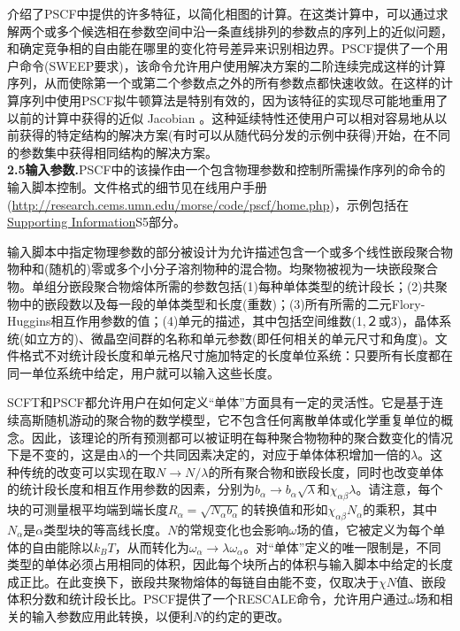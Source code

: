 \documentclass[12pt,a4paper]{article}
\begin{document}
介绍了PSCF中提供的许多特征，以简化相图的计算。在这类计算中，可以通过求解两个或多个候选相在参数空间中沿一条直线排列的参数点的序列上的近似问题，和确定竞争相的自由能在哪里的变化符号差异来识别相边界。PSCF提供了一个用户命令(SWEEP要求)，该命令允许用户使用解决方案的二阶连续完成这样的计算序列，从而使除第一个或第二个参数点之外的所有参数点都快速收敛。在这样的计算序列中使用PSCF拟牛顿算法是特别有效的，因为该特征的实现尽可能地重用了以前的计算中获得的近似 Jacobian 。这种延续特性还使用户可以相对容易地从以前获得的特定结构的解决方案(有时可以从随代码分发的示例中获得)开始，在不同的参数集中获得相同结构的解决方案。\\
\textbf{2.5输入参数.}PSCF中的该操作由一个包含物理参数和控制所需操作序列的命令的输入脚本控制。文件格式的细节见在线用户手册(\url{http://research.cems.umn.edu/morse/code/pscf/home.php})，示例包括在\href{http://pubs.acs.org/doi/suppl/10.1021/acs.macromol.6b00107/suppl_file/ma6b00107_si_001.pdf}{Supporting Information}S5部分。

输入脚本中指定物理参数的部分被设计为允许描述包含一个或多个线性嵌段聚合物物种和(随机的)零或多个小分子溶剂物种的混合物。均聚物被视为一块嵌段聚合物。单组分嵌段聚合物熔体所需的参数包括(1)每种单体类型的统计段长；(2)共聚物中的嵌段数以及每一段的单体类型和长度(重数)；(3)所有所需的二元Flory-Huggins相互作用参数的值；(4)单元的描述，其中包括空间维数(1,２或3)，晶体系统(如立方的)、微晶空间群的名称和单元参数(即任何相关的单元尺寸和角度)。文件格式不对统计段长度和单元格尺寸施加特定的长度单位系统：只要所有长度都在同一单位系统中给定，用户就可以输入这些长度。

SCFT和PSCF都允许用户在如何定义“单体”方面具有一定的灵活性。它是基于连续高斯随机游动的聚合物的数学模型，它不包含任何离散单体或化学重复单位的概念。因此，该理论的所有预测都可以被证明在每种聚合物物种的聚合数变化的情况下是不变的，这是由$\lambda$的一个共同因素决定的，对应于单体体积增加一倍的$\lambda$。这种传统的改变可以实现在取$N \rightarrow N/ \lambda$的所有聚合物和嵌段长度，同时也改变单体的统计段长度和相互作用参数的因素，分别为$b_{\alpha}\rightarrow b_{\alpha}\sqrt{\lambda}$和$\chi _{\alpha \beta} \lambda$。请注意，每个块的可测量根平均端到端长度$R_{\alpha}=\sqrt{N_{\alpha}b_{\alpha}}$的转换值和形如$\chi _{\alpha \beta} N_{\alpha}$的乘积，其中$N_{\alpha}$是$\alpha$类型块的等高线长度。$N$的常规变化也会影响$\omega$场的值，它被定义为每个单体的自由能除以$k_BT$，从而转化为$\omega _{\alpha} \rightarrow \lambda \omega _{\alpha}$。对“单体”定义的唯一限制是，不同类型的单体必须占用相同的体积，因此每个块所占的体积与输入脚本中给定的长度成正比。在此变换下，嵌段共聚物熔体的每链自由能不变，仅取决于$\chi N$值、嵌段体积分数和统计段长比。PSCF提供了一个RESCALE命令，允许用户通过$\omega$场和相关的输入参数应用此转换，以便利$N$的约定的更改。
\end{document}

